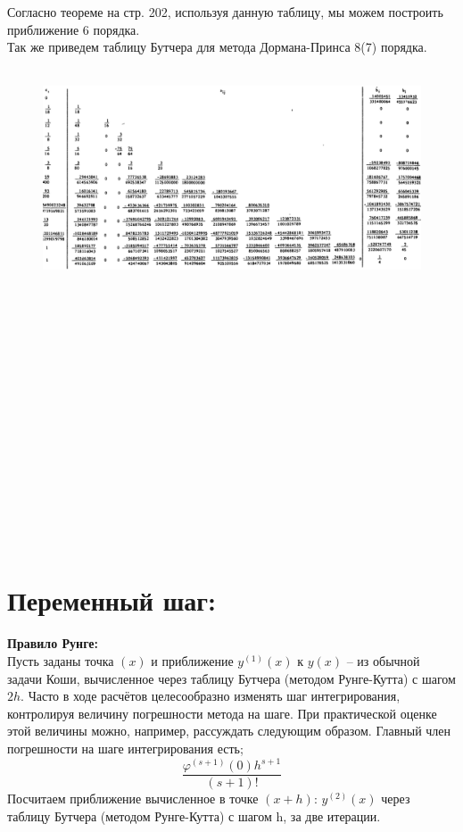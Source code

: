 \documentclass[12pt, a4paper] {article}
\theoremstyle{remark}
\theoremstyle{definition}
\begin{document}
Согласно теореме на стр. 202, используя данную таблицу, мы можем построить приближение 6 порядка.\\
Так же приведем таблицу Бутчера для метода Дормана-Принса 8(7) порядка.\\
\\\begin{figure}[h!]
\centering
\includegraphics[width=1\linewidth]{dp78.png} 
\end{figure}
\\
\\
\\ \\ \\ \\ \\ \\ \\ \\ \\ \\ \\ \\ \\ 
\section{Переменный шаг:}

\textbf{Правило Рунге:}\\
Пусть заданы точка $(x)$ и приближение $y^{(1)} (x)$ к $y(x)$ -- из обычной задачи Коши, вычисленное через таблицу Бутчера (методом Рунге-Кутта) с шагом $2h.$
Часто в ходе расчётов целесообразно изменять шаг интегрирования, контролируя величину погрешности метода на шаге. При практической оценке этой величины можно, например, рассуждать следующим образом. Главный член погрешности на шаге интегрирования есть;
$$\frac{\varphi^{(s+1)} (0) h^{s+1}}{(s+1)!}$$
Посчитаем приближение вычисленное в точке $(x+h)$: $y^{(2)}(x)$ через таблицу Бутчера (методом Рунге-Кутта) с шагом h, за две итерации.
\end{document}
